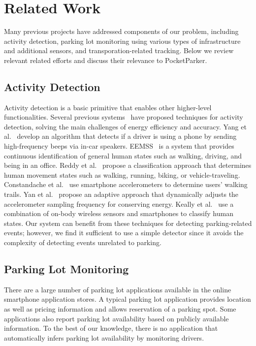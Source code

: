 \section{Related Work}
\label{sec-related}

Many previous projects have addressed components of our problem, including
activity detection, parking lot monitoring using various types of
infrastructure and additional sensors, and transporation-related tracking.
Below we review relevant related efforts and discuss their relevance to
PocketParker.

\subsection{Activity Detection}

Activity detection is a basic primitive that enables other higher-level
functionalities. Several previous systems~\cite{Constandache:2010:DYS,
Keally:2011:PTP, Reddy:2010:UMP, Yang:2011:DDP, Wang:2009:FEE} have proposed
techniques for activity detection, solving the main challenges of energy
efficiency and accuracy. Yang et al.~\cite{Yang:2011:DDP} develop an algorithm
that detects if a driver is using a phone by sending high-frequency beeps via
in-car speakers. EEMSS~\cite{Wang:2009:FEE} is a system that provides continuous
identification of general human states such as walking, driving, and being in an
office. Reddy et al.~\cite{Reddy:2010:UMP} propose a classification approach
that determines human movement states such as walking, running, biking, or
vehicle-traveling. Constandache et al.~\cite{Constandache:2010:DYS} use
smartphone accelerometers to determine users' walking trails. Yan et
al.~\cite{6246136} propose an adaptive approach that dynamically adjusts the
accelerometer sampling frequency for conserving energy. Keally et
al.~\cite{Keally:2011:PTP} use a combination of on-body wireless sensors and
smartphones to classify human states. Our system can benefit from these
techniques for detecting parking-related events; however, we find it sufficient
to use a simple detector since it avoids the complexity of detecting events
unrelated to parking.

\subsection{Parking Lot Monitoring}

There are a large number of parking lot applications available in the online
smartphone application stores. A typical parking lot application provides
location as well as pricing information and allows reservation of a parking
spot. Some applications also report parking lot availability based on publicly
available information. To the best of our knowledge, there is no application
that automatically infers parking lot availability by monitoring drivers.

